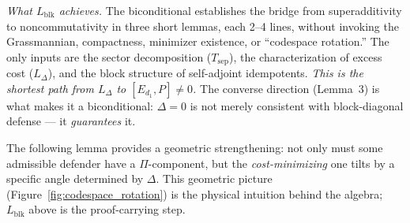 \documentclass[11pt]{article}
\theoremstyle{remark}
\begin{document}
\smallskip\noindent\textit{What $L_{\mathrm{blk}}$ achieves.}  The biconditional establishes the bridge from superadditivity to noncommutativity in three short lemmas, each 2--4 lines, without invoking the Grassmannian, compactness, minimizer existence, or ``codespace rotation.''  The only inputs are the sector decomposition ($T_{\mathrm{sep}}$), the characterization of excess cost ($L_\Delta$), and the block structure of self-adjoint idempotents.  \emph{This is the shortest path from $L_\Delta$ to $[E_{d_1}, P] \ne 0$.}  The converse direction (Lemma~3) is what makes it a biconditional: $\Delta = 0$ is not merely consistent with block-diagonal defense --- it \emph{guarantees} it.

\medskip\noindent The following lemma provides a geometric strengthening: not only must some admissible defender have a $\Pi$-component, but the \emph{cost-minimizing} one tilts by a specific angle determined by $\Delta$.  This geometric picture (Figure~\ref{fig:codespace_rotation}) is the physical intuition behind the algebra; $L_{\mathrm{blk}}$ above is the proof-carrying step.
\end{document}
